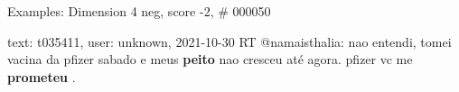 \begin{frame}{Examples: Dimension 4 neg, score -2, \# 000050}
\footnotesize
\begin{alertblock}{text: t035411, user: unknown, 2021-10-30}
RT @namaisthalia: nao entendi, tomei vacina da pfizer sabado e meus 
\textbf{peito} nao cresceu até agora. pfizer vc me \textbf{prometeu} . 
\end{alertblock}
\end{frame}
